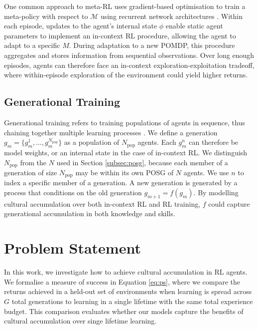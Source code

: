 \documentclass{article}
\begin{document}
One common approach to meta-RL uses gradient-based optimisation to train a meta-policy with respect to $\mathcal{M}$ using recurrent network architectures  \citep{Duan16, wang2016learning}. Within each episode, updates to the agent's internal state $\phi$ enable static agent parameters to implement an in-context RL procedure, allowing the agent to adapt to a specific $M$. During adaptation to a new POMDP, this procedure aggregates and stores information from sequential observations. Over long enough episodes, agents can therefore face an in-context exploration-exploitation tradeoff, where within-episode exploration of the environment could yield higher returns. 

\subsection{Generational Training}
\label{subsec:gen_train}

Generational training refers to training populations of agents in sequence, thus chaining together multiple learning processes \citep{Stooke21}. We define a generation $g_m = \{ g^1_m, \dots, g^{N_\text{pop}}_m \}$ as a population of $N_\text{pop}$ agents. Each $g^n_m$ can therefore be model weights, or an internal state in the case of in-context RL. We distinguish $N_\text{pop}$ from the $N$ used in Section \ref{subsec:posg}, because each member of a generation of size $N_\text{pop}$ may be within its own POSG of $N$ agents. We use $n$ to index a specific member of a generation. A new generation is generated by a process that conditions on the old generation $g_{m+1} = f(g_{m})$. By modelling cultural accumulation over both in-context RL and RL training, $f$ could capture generational accumulation in both knowledge and skills.


\section{Problem Statement}
\label{sec:statement}

In this work, we investigate how to achieve cultural accumulation in RL agents. We formalise a measure of success in Equation \ref{eq:ps}, where we compare the returns achieved in a held-out set of environments when learning is spread across $G$ total generations to learning in a single lifetime with the same total experience budget. This comparison evaluates whether our models capture the benefits of cultural accumulation over singe lifetime learning.  
\end{document}
